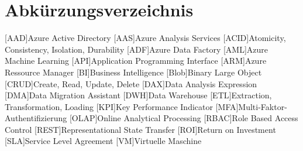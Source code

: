 \renewcommand{\chaptermark}[1]{\markboth{\spacedlowsmallcaps{#1}}{\spacedlowsmallcaps{#1}}}
\renewcommand{\sectionmark}[1]{\markright{\thesection\enspace\spacedlowsmallcaps{#1}}}
\chapter*{Abk\"{u}rzungsverzeichnis}

\begin{acronym}[OLAP]
    [AAD]{Azure Active Directory}
    [AAS]{Azure Analysis Services}
    [ACID]{Atomicity, Consistency, Isolation, Durability}
    [ADF]{Azure Data Factory}
    [AML]{Azure Machine Learning}
    [API]{Application Programming Interface}
    [ARM]{Azure Ressource Manager}
    [BI]{Business Intelligence}
    [Blob]{Binary Large Object}
    [CRUD]{Create, Read, Update, Delete}
    [DAX]{Data Analysis Expression}
    [DMA]{Data Migration Assistant}
    [DWH]{Data Warehouse}
    [ETL]{Extraction, Transformation, Loading}
    [KPI]{Key Performance Indicator}
    [MFA]{Multi-Faktor-Authentifizierung}
    [OLAP]{Online Analytical Processing}
    [RBAC]{Role Based Access Control}
    [REST]{Representational State Transfer}
    [ROI]{Return on Investment}
    [SLA]{Service Level Agreement}
    [VM]{Virtuelle Maschine}
\end{acronym}
\cleardoublepage